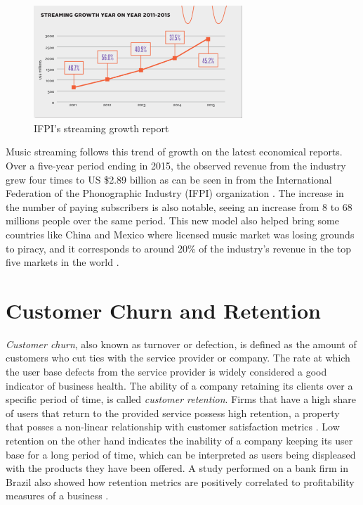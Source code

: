 \documentclass{kththesis}
\begin{document}
	\begin{figure}[h]
    \centering
    \includegraphics[width=0.7\textwidth, natwidth=580bp, natheight=313bp]{figures/ifpi_stream_growth.png}
    \caption{IFPI's streaming growth report}
    \label{fig:ifpi-growth-report}
\end{figure}

	Music streaming follows this trend of growth on the latest economical reports. Over a five-year period ending in 2015, the observed revenue from the industry grew four times to US \$2.89 billion as can be seen in  from the International Federation of the Phonographic Industry (IFPI) organization \citep{ifpi}. The increase in the number of paying subscribers is also notable, seeing an increase from 8 to 68 millions people over the same period. This new model also helped bring some countries like China and Mexico where licensed music market was losing grounds to piracy, and it corresponds to around 20\% of the industry's revenue in the top five markets in the world \citep{ifpi}. 
	  
\section{Customer Churn and Retention} 

\emph{Customer churn}, also known as turnover or defection, is defined as the amount of customers who cut ties with the service provider or company. The rate at which the user base defects from the service provider is widely considered a good indicator of business health. The ability of a company retaining its clients over a specific period of time, is called \emph{customer retention}. Firms that have a high share of users that return to the provided service possess high retention, a property that posses a non-linear relationship with customer satisfaction metrics \citep{hennig1997impact}. Low retention on the other hand indicates the inability of a company keeping its user base for a long period of time, which can be interpreted as users being displeased with the products they have been offered. A study performed on a bank firm in Brazil also showed how retention metrics are positively correlated to profitability measures of a business \citep{morgan2006value}. 
        
\end{document}
